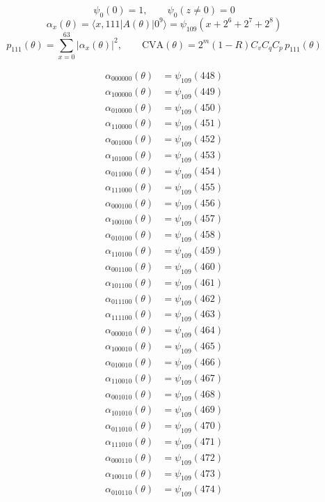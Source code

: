 \[
\psi_0(0)=1,\qquad \psi_0(z\ne0)=0
\]
\[
\alpha_x(\theta)=\langle x,111|A(\theta)|0^9\rangle=\psi_{109}(x+2^6+2^7+2^8)
\]
\[
p_{111}(\theta)=\sum_{x=0}^{63}|\alpha_x(\theta)|^2,\qquad \mathrm{CVA}(\theta)=2^m(1-R)C_vC_qC_p\,p_{111}(\theta)
\]

\begin{align*}
\alpha_{000000}(\theta)&=\psi_{109}(448)\\
\alpha_{100000}(\theta)&=\psi_{109}(449)\\
\alpha_{010000}(\theta)&=\psi_{109}(450)\\
\alpha_{110000}(\theta)&=\psi_{109}(451)\\
\alpha_{001000}(\theta)&=\psi_{109}(452)\\
\alpha_{101000}(\theta)&=\psi_{109}(453)\\
\alpha_{011000}(\theta)&=\psi_{109}(454)\\
\alpha_{111000}(\theta)&=\psi_{109}(455)\\
\alpha_{000100}(\theta)&=\psi_{109}(456)\\
\alpha_{100100}(\theta)&=\psi_{109}(457)\\
\alpha_{010100}(\theta)&=\psi_{109}(458)\\
\alpha_{110100}(\theta)&=\psi_{109}(459)\\
\alpha_{001100}(\theta)&=\psi_{109}(460)\\
\alpha_{101100}(\theta)&=\psi_{109}(461)\\
\alpha_{011100}(\theta)&=\psi_{109}(462)\\
\alpha_{111100}(\theta)&=\psi_{109}(463)\\
\alpha_{000010}(\theta)&=\psi_{109}(464)\\
\alpha_{100010}(\theta)&=\psi_{109}(465)\\
\alpha_{010010}(\theta)&=\psi_{109}(466)\\
\alpha_{110010}(\theta)&=\psi_{109}(467)\\
\alpha_{001010}(\theta)&=\psi_{109}(468)\\
\alpha_{101010}(\theta)&=\psi_{109}(469)\\
\alpha_{011010}(\theta)&=\psi_{109}(470)\\
\alpha_{111010}(\theta)&=\psi_{109}(471)\\
\alpha_{000110}(\theta)&=\psi_{109}(472)\\
\alpha_{100110}(\theta)&=\psi_{109}(473)\\
\alpha_{010110}(\theta)&=\psi_{109}(474)\\

\end{align*}
